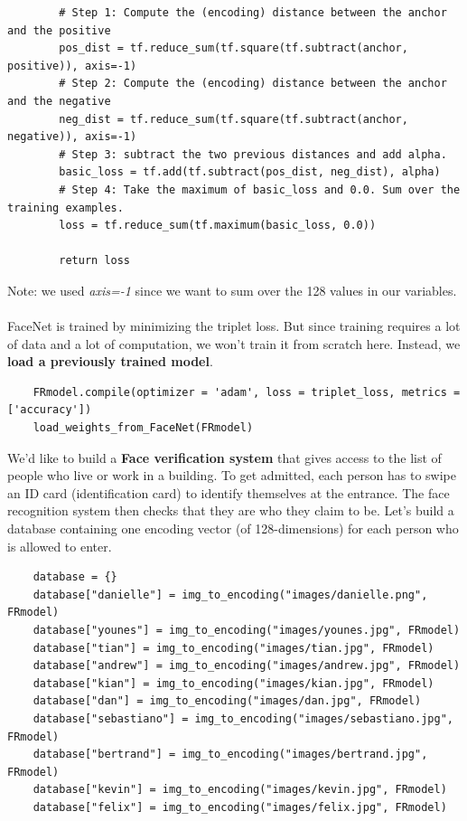 \documentclass[11pt, a4paper]{article}
\begin{document}
\begin{spacing}{1.1}
\begin{lstlisting}
		# Step 1: Compute the (encoding) distance between the anchor and the positive
		pos_dist = tf.reduce_sum(tf.square(tf.subtract(anchor, positive)), axis=-1)
		# Step 2: Compute the (encoding) distance between the anchor and the negative
		neg_dist = tf.reduce_sum(tf.square(tf.subtract(anchor, negative)), axis=-1)
		# Step 3: subtract the two previous distances and add alpha.
		basic_loss = tf.add(tf.subtract(pos_dist, neg_dist), alpha)
		# Step 4: Take the maximum of basic_loss and 0.0. Sum over the training examples.
		loss = tf.reduce_sum(tf.maximum(basic_loss, 0.0))
		
		return loss	\end{lstlisting} \vspace*{1mm}
	Note: we used \textit{axis=-1} since we want to sum over the 128 values in our variables. \\~\\
	FaceNet is trained by minimizing the triplet loss. But since training requires a lot of data and a lot of computation, we won't train it from scratch here. Instead, we \textbf{load a previously trained model}.
	\begin{lstlisting}
	FRmodel.compile(optimizer = 'adam', loss = triplet_loss, metrics = ['accuracy'])
	load_weights_from_FaceNet(FRmodel) \end{lstlisting} \vspace*{1mm}
	We'd like to build a \textbf{Face verification system} that gives access to the list of people who live or work in a building. To get admitted, each person has to swipe an ID card (identification card) to identify themselves at the entrance. The face recognition system then checks that they are who they claim to be. Let's build a database containing one encoding vector (of 128-dimensions) for each person who is allowed to enter.
	\begin{lstlisting}
	database = {}
	database["danielle"] = img_to_encoding("images/danielle.png", FRmodel)
	database["younes"] = img_to_encoding("images/younes.jpg", FRmodel)
	database["tian"] = img_to_encoding("images/tian.jpg", FRmodel)
	database["andrew"] = img_to_encoding("images/andrew.jpg", FRmodel)
	database["kian"] = img_to_encoding("images/kian.jpg", FRmodel)
	database["dan"] = img_to_encoding("images/dan.jpg", FRmodel)
	database["sebastiano"] = img_to_encoding("images/sebastiano.jpg", FRmodel)
	database["bertrand"] = img_to_encoding("images/bertrand.jpg", FRmodel)
	database["kevin"] = img_to_encoding("images/kevin.jpg", FRmodel)
	database["felix"] = img_to_encoding("images/felix.jpg", FRmodel)

\end{lstlisting}
\end{spacing}
\end{document}
